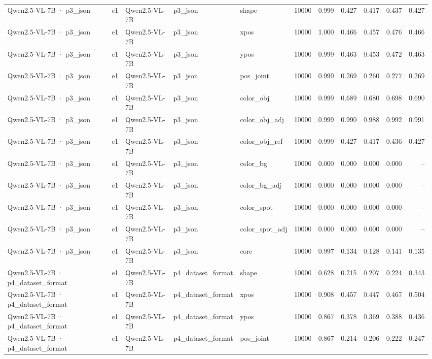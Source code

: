 \begin{tabular}{lllllrrrrrr}
Qwen2.5-VL-7B · p3\_json & e1 & Qwen2.5-VL-7B & p3\_json & shape & 10000 & 0.999 & 0.427 & 0.417 & 0.437 & 0.427 \\
Qwen2.5-VL-7B · p3\_json & e1 & Qwen2.5-VL-7B & p3\_json & xpos & 10000 & 1.000 & 0.466 & 0.457 & 0.476 & 0.466 \\
Qwen2.5-VL-7B · p3\_json & e1 & Qwen2.5-VL-7B & p3\_json & ypos & 10000 & 0.999 & 0.463 & 0.453 & 0.472 & 0.463 \\
Qwen2.5-VL-7B · p3\_json & e1 & Qwen2.5-VL-7B & p3\_json & pos\_joint & 10000 & 0.999 & 0.269 & 0.260 & 0.277 & 0.269 \\
Qwen2.5-VL-7B · p3\_json & e1 & Qwen2.5-VL-7B & p3\_json & color\_obj & 10000 & 0.999 & 0.689 & 0.680 & 0.698 & 0.690 \\
Qwen2.5-VL-7B · p3\_json & e1 & Qwen2.5-VL-7B & p3\_json & color\_obj\_adj & 10000 & 0.999 & 0.990 & 0.988 & 0.992 & 0.991 \\
Qwen2.5-VL-7B · p3\_json & e1 & Qwen2.5-VL-7B & p3\_json & color\_obj\_ref & 10000 & 0.999 & 0.427 & 0.417 & 0.436 & 0.427 \\
Qwen2.5-VL-7B · p3\_json & e1 & Qwen2.5-VL-7B & p3\_json & color\_bg & 10000 & 0.000 & 0.000 & 0.000 & 0.000 & -- \\
Qwen2.5-VL-7B · p3\_json & e1 & Qwen2.5-VL-7B & p3\_json & color\_bg\_adj & 10000 & 0.000 & 0.000 & 0.000 & 0.000 & -- \\
Qwen2.5-VL-7B · p3\_json & e1 & Qwen2.5-VL-7B & p3\_json & color\_spot & 10000 & 0.000 & 0.000 & 0.000 & 0.000 & -- \\
Qwen2.5-VL-7B · p3\_json & e1 & Qwen2.5-VL-7B & p3\_json & color\_spot\_adj & 10000 & 0.000 & 0.000 & 0.000 & 0.000 & -- \\
Qwen2.5-VL-7B · p3\_json & e1 & Qwen2.5-VL-7B & p3\_json & core & 10000 & 0.997 & 0.134 & 0.128 & 0.141 & 0.135 \\
Qwen2.5-VL-7B · p4\_dataset\_format & e1 & Qwen2.5-VL-7B & p4\_dataset\_format & shape & 10000 & 0.628 & 0.215 & 0.207 & 0.224 & 0.343 \\
Qwen2.5-VL-7B · p4\_dataset\_format & e1 & Qwen2.5-VL-7B & p4\_dataset\_format & xpos & 10000 & 0.908 & 0.457 & 0.447 & 0.467 & 0.504 \\
Qwen2.5-VL-7B · p4\_dataset\_format & e1 & Qwen2.5-VL-7B & p4\_dataset\_format & ypos & 10000 & 0.867 & 0.378 & 0.369 & 0.388 & 0.436 \\
Qwen2.5-VL-7B · p4\_dataset\_format & e1 & Qwen2.5-VL-7B & p4\_dataset\_format & pos\_joint & 10000 & 0.867 & 0.214 & 0.206 & 0.222 & 0.247 \\

\end{tabular}
